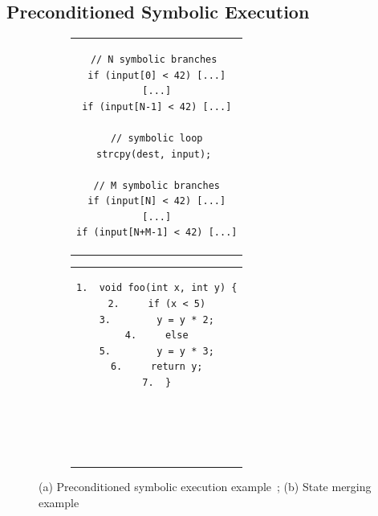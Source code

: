 \subsection{Preconditioned Symbolic Execution}%
\label{precontioned-symbolic-execution}

\begin{figure}[t]
\centering
\begin{subfigure}[t]{.4\textwidth}
\begin{tabular}{c}
\begin{lstlisting}[basicstyle=\ttfamily\scriptsize]
// N symbolic branches 
if (input[0] < 42) [...]
[...]
if (input[N-1] < 42) [...]

// symbolic loop
strcpy(dest, input); 

// M symbolic branches
if (input[N] < 42) [...]
[...]
if (input[N+M-1] < 42) [...]
\end{lstlisting}
\end{tabular}
\caption{\label{fig:preconditioned}}
\end{subfigure}
\begin{subfigure}[t]{.4\textwidth}
\begin{tabular}{c}
\lstset{
   showlines=true
}
\begin{lstlisting}[basicstyle=\ttfamily\scriptsize]
1.  void foo(int x, int y) {
2.     if (x < 5)
3.        y = y * 2;
4.     else
5.        y = y * 3;
6.     return y;
7.  }





\end{lstlisting}
\end{tabular}
\caption{\label{fi:example-state-merging} }
\end{subfigure}
\caption{\label{fig:preconditioned-and-merge} (a) Preconditioned symbolic execution example~\protect\cite{AEG-NDSS11}; (b) State merging example}
\end{figure}

